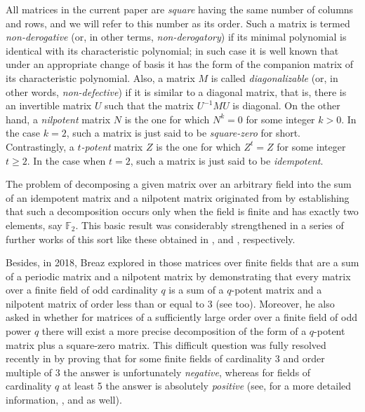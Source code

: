 \documentclass{amsart}
\theoremstyle{definition}
\theoremstyle{remark}
\numberwithin{equation}{section}
\begin{document}
All matrices in the current paper are {\it square} having the same number of columns and rows, and we will refer to this number as its order. Such a matrix is termed {\it non-derogative} (or, in other terms, {\it non-derogatory}) if its minimal polynomial is identical with its characteristic polynomial; in such case it is well known that under an appropriate change of basis it has the form of the companion matrix of its characteristic polynomial. Also, a matrix $M$ is called {\it diagonalizable} (or, in other words, {\it non-defective}) if it is similar to a diagonal matrix, that is, there is an invertible matrix $U$ such that the matrix $U^{-1}MU$ is diagonal. On the other hand, a {\it nilpotent} matrix $N$ is the one for which $N^k = 0$ for some integer $k>0$. In the case $k=2$, such a matrix is just said to be {\it square-zero} for short. Contrastingly, a {\it $t$-potent} matrix $Z$ is the one for which $Z^t=Z$ for some integer $t\geq 2$. In the case when $t=2$, such a matrix is just said to be {\it idempotent}.

\medskip

The problem of decomposing a given matrix over an arbitrary field into the sum of an idempotent matrix and a nilpotent matrix originated from \cite{BCDM} by establishing that such a decomposition occurs only when the field is finite and has exactly two elements, say $\mathbb{F}_2$. This basic result was considerably strengthened in a series of further works of this sort like these obtained in \cite{St1}, \cite{St2} and \cite{Sh}, respectively.

\medskip

Besides, in 2018, Breaz explored in \cite{Br} those matrices over finite fields that are a sum of a periodic matrix and a nilpotent matrix by demonstrating that every matrix over a finite field of odd cardinality $q$ is a sum of a $q$-potent matrix and a nilpotent matrix of order less than or equal to $3$ (see \cite{BM} too). Moreover, he also asked in \cite[Remark 7]{Br} whether for matrices of a sufficiently large order over a finite field of odd power $q$ there will exist a more precise decomposition of the form of a $q$-potent matrix plus a square-zero matrix. This difficult question was fully resolved recently in \cite{DGL4} by proving that for some finite fields of cardinality 3 and order multiple of 3 the answer is unfortunately {\it negative}, whereas for fields of cardinality $q$ at least 5 the answer is absolutely {\it positive} (see, for a more detailed information, \cite{DGL1}, \cite{DGL2} and \cite{DGL3} as well).
\end{document}
